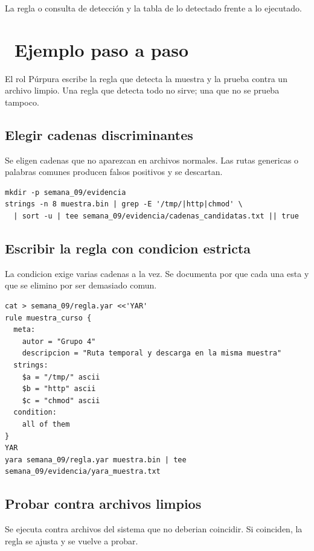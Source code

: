 \documentclass[11pt,a4paper]{article}
\newcommand{\iconotexto}[2]{\textcolor{cyanNeon}{\faIcon{#1}}~#2}
\begin{document}
La regla o consulta de detección y la tabla de lo detectado frente a lo ejecutado.

\section{\iconotexto{list-ol}{Ejemplo paso a paso}}

El rol Púrpura escribe la regla que detecta la muestra y la prueba contra un archivo limpio. Una regla que detecta todo no sirve; una que no se prueba tampoco.

\subsection{Elegir cadenas discriminantes}

Se eligen cadenas que no aparezcan en archivos normales. Las rutas genericas o palabras comunes producen falsos positivos y se descartan.

\begin{lstlisting}[style=estiloCodigo]
mkdir -p semana_09/evidencia
strings -n 8 muestra.bin | grep -E '/tmp/|http|chmod' \
  | sort -u | tee semana_09/evidencia/cadenas_candidatas.txt || true
\end{lstlisting}

\subsection{Escribir la regla con condicion estricta}

La condicion exige varias cadenas a la vez. Se documenta por que cada una esta y que se elimino por ser demasiado comun.

\begin{lstlisting}[style=estiloCodigo]
cat > semana_09/regla.yar <<'YAR'
rule muestra_curso {
  meta:
    autor = "Grupo 4"
    descripcion = "Ruta temporal y descarga en la misma muestra"
  strings:
    $a = "/tmp/" ascii
    $b = "http" ascii
    $c = "chmod" ascii
  condition:
    all of them
}
YAR
yara semana_09/regla.yar muestra.bin | tee semana_09/evidencia/yara_muestra.txt
\end{lstlisting}

\subsection{Probar contra archivos limpios}

Se ejecuta contra archivos del sistema que no deberian coincidir. Si coinciden, la regla se ajusta y se vuelve a probar.
\end{document}
